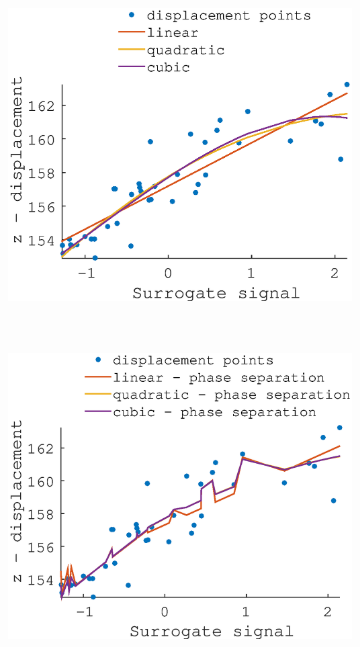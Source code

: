 \documentclass[11pt,a4paper,oneside]{report}
\begin{document}
\begin{figure}[H]
  \centering
  \hspace*{-2em}
  \begin{subfigure}[b]{0.33\textwidth}
    \includegraphics[width=\textwidth]{figures/task2/fit_round1_couch1.eps}
  \end{subfigure}%
    ~ %
  \begin{subfigure}[b]{0.33\textwidth}
    \includegraphics[width=\textwidth]{figures/task2/fit_round2_couch1.eps}

\end{subfigure}
\end{figure}
\end{document}
